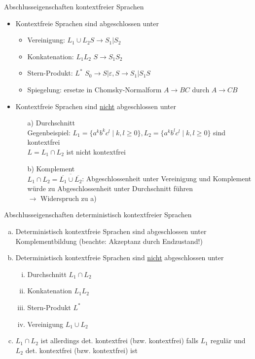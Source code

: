 \begin{frame}{Abschlusseigenschaften kontextfreier Sprachen}
	\begin{itemize}
		\item Kontextfreie Sprachen sind abgeschlossen unter
		\begin{itemize}
			\item Vereinigung: $L_1\cup L_2$\qquad $S \rightarrow S_1|S_2$
			\item Konkatenation: $L_1L_2$ \qquad $S\rightarrow S_1S_2$
			\item Stern-Produkt: $L^*$ \qquad $S_0\rightarrow S|\varepsilon, S\rightarrow S_1|S_1S$
			\item Spiegelung: ersetze in Chomsky-Normalform $A\rightarrow BC$ durch $A \rightarrow CB$
		\end{itemize}
		\item Kontextfreie Sprachen sind \underline{nicht} abgeschlossen unter
		\begin{itemize}
			\item [a)] Durchschnitt\\
			Gegenbeispiel: $L_1=\{a^kb^kc^l\mid k,l\geq 0\}, L_2=\{a^kb^lc^l\mid k,l\geq 0\}$ sind kontextfrei\\
			$L=L_1\cap L_2$ ist nicht kontextfrei
			\item [b)] Komplement\\
			$L_1 \cap L_2 = \overline{\overline{L_1} \cup \overline{L_2}}$: Abgeschlossenheit unter Vereinigung und Komplement würde zu Abgeschlossenheit unter Durchschnitt führen\\
			$\rightarrow$ Widerspruch zu a) \lightning
			
		\end{itemize}
	\end{itemize}
\end{frame}

\begin{frame}{Abschlusseigenschaften deterministisch kontextfreier Sprachen}
	\begin{enumerate}[a)]
		\item Deterministisch kontextfreie Sprachen sind abgeschlossen unter Komplementbildung (beachte: Akzeptanz durch Endzustand!)
		\item Deterministisch kontextfreie Sprachen sind \underline{nicht} abgeschlossen unter
		\begin{enumerate}[i.]
			\item Durchschnitt $L_1 \cap L_2$
			\item Konkatenation $L_1L_2$
			\item Stern-Produkt $L^*$
			\item Vereinigung $L_1 \cup L_2$
		\end{enumerate}
		\item $L_1 \cap L_2$ ist allerdings det. kontextfrei (bzw. kontextfrei) falls $L_1$ regulär und $L_2$ det. kontextfrei (bzw. kontextfrei) ist
	\end{enumerate}
\end{frame}
